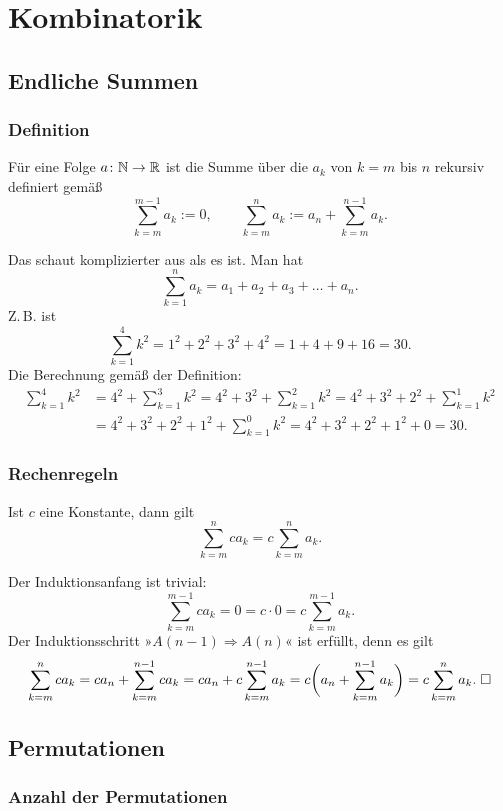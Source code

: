 
\chapter{Kombinatorik}

\section{Endliche Summen}
\subsection{Definition}

\begin{Definition}[Summe]
Für eine Folge $a\colon\mathbb N\to\mathbb R$ ist die Summe über die $a_k$
von $k=m$ bis $n$ rekursiv definiert gemäß%
\[
\sum_{k=m}^{m-1} a_k := 0,\qquad
\sum_{k=m}^n a_k := a_n+\sum_{k=m}^{n-1} a_k.
\]
\end{Definition}
Das schaut komplizierter aus als es ist. Man hat
\[\sum_{k=1}^n a_k = a_1+a_2+a_3+\ldots+a_n.\]
Z.\,B. ist
\[\sum_{k=1}^4 k^2 = 1^2+2^2+3^2+4^2 = 1+4+9+16 = 30.\]
Die Berechnung gemäß der Definition:
\begin{align*}
\sum_{k=1}^4 k^2 &= 4^2+\sum_{k=1}^3 k^2
= 4^2+3^2+\sum_{k=1}^2 k^2
= 4^2+3^2+2^2+\sum_{k=1}^1 k^2\\
&= 4^2+3^2+2^2+1^2+\sum_{k=1}^{0} k^2 = 4^2+3^2+2^2+1^2+0 = 30.
\end{align*}

\subsection{Rechenregeln}
\begin{Satz}%
Ist $c$ eine Konstante, dann gilt
\[\sum_{k=m}^n ca_k = c\sum_{k=m}^n a_k.\]
\end{Satz}
Der Induktionsanfang ist trivial:
\[\sum_{k=m}^{m-1} ca_k = 0 = c\cdot 0 = c\sum_{k=m}^{m-1} a_k.\]
Der Induktionsschritt »$A(n-1)\Rightarrow A(n)$« ist erfüllt, denn es gilt
\[\sum_{k=m}^n ca_k = ca_n+\sum_{k=m}^{n-1} ca_k = ca_n+c\sum_{k=m}^{n-1} a_k
= c\bigg(a_n+\sum_{k=m}^{n-1} a_k\bigg) = c\sum_{k=m}^n a_k.\;\Box\]

\section{Permutationen}%

\subsection{Anzahl der Permutationen}

